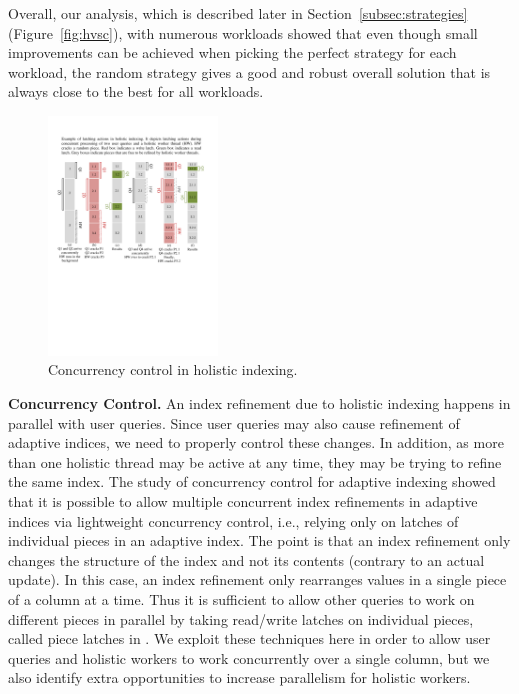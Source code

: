 Overall, our analysis, which is described later in Section~\ref{subsec:strategies} (Figure~\ref{fig:hvsc}), with numerous workloads showed
that even though small improvements can be achieved when picking the perfect strategy for each workload,
the random strategy gives a good and robust overall solution that is always close to the best for all workloads.
 
\begin{figure}
\hspace{3em}
\includegraphics[trim=2.5cm 13cm 1.5cm 2.5cm,width=0.4\textwidth]{Figures/holistic/latching}
\vspace{0.5em}
\caption{Concurrency control in holistic indexing.}
\vspace{-0.4cm}
\label{fig:conc}
\end{figure}
\textbf{Concurrency Control.}  
An index refinement due to holistic indexing happens in parallel with user queries.
Since user queries may also cause refinement of adaptive indices, we need to properly control
these changes. In addition, as more than one holistic thread may be active at any time, they may 
be trying to refine the same index. 
The study of concurrency control for adaptive indexing \cite{DBLP:journals/pvldb/GraefeHIKM12, DBLP:journals/vldb/GraefeHIKMS14} showed that it is possible to allow multiple
concurrent index refinements in adaptive indices via lightweight concurrency control, i.e., relying only on latches of individual pieces
in an adaptive index.
The point is that an index refinement only changes the structure of the index and not its contents (contrary to an actual update).
In this case, an index refinement only rearranges values in a single piece of a column at a time.
Thus it is sufficient to allow
other queries to work on different pieces in parallel by taking 
read/write latches on individual pieces, called piece latches in \cite{DBLP:journals/pvldb/GraefeHIKM12, DBLP:journals/vldb/GraefeHIKMS14}.
We exploit these techniques here in order to allow user queries and holistic workers to work concurrently over a single column, but
we also identify extra opportunities to increase parallelism for holistic workers.

